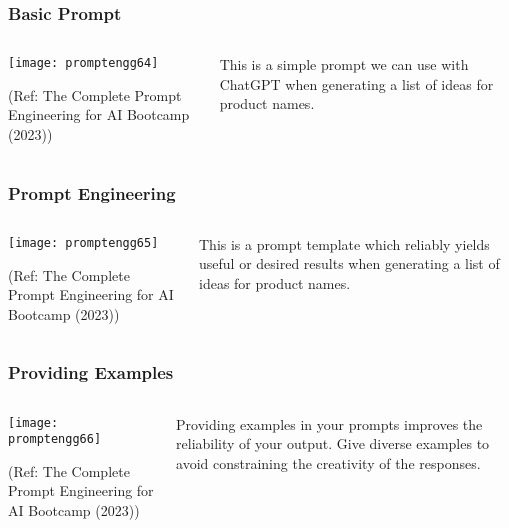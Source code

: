 \begin{frame}[fragile]\frametitle{Basic Prompt}

\begin{columns}
    \begin{column}[T]{0.6\linewidth}
		\begin{center}
		\texttt{[image: promptengg64]}

		{\tiny (Ref: The Complete Prompt Engineering for AI Bootcamp (2023))}
		\end{center}	
    \end{column}
    \begin{column}[T]{0.4\linewidth}
		This is a simple prompt we can use with ChatGPT when generating a list of ideas
for product names.
    \end{column}
  \end{columns}
\end{frame}

\begin{frame}[fragile]\frametitle{Prompt Engineering}

\begin{columns}
    \begin{column}[T]{0.6\linewidth}
		\begin{center}
		\texttt{[image: promptengg65]}

		{\tiny (Ref: The Complete Prompt Engineering for AI Bootcamp (2023))}
		\end{center}	
    \end{column}
    \begin{column}[T]{0.4\linewidth}
		This is a prompt template which reliably yields useful or desired results when
generating a list of ideas for product names.
    \end{column}
  \end{columns}
\end{frame}

\begin{frame}[fragile]\frametitle{Providing Examples}

\begin{columns}
    \begin{column}[T]{0.6\linewidth}
		\begin{center}
		\texttt{[image: promptengg66]}

		{\tiny (Ref: The Complete Prompt Engineering for AI Bootcamp (2023))}
		\end{center}	
    \end{column}
    \begin{column}[T]{0.4\linewidth}
		Providing examples in your prompts improves the reliability of your output.
		Give diverse examples to avoid constraining the creativity of the responses.
    \end{column}
  \end{columns}
\end{frame}


